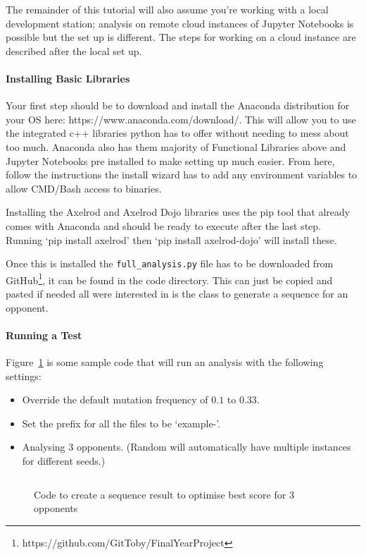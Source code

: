 The remainder of this tutorial will also assume you're working with a local development station;
analysis on remote cloud instances of Jupyter Notebooks is possible but the set up is different.
The steps for working on a cloud instance are described after the local set up.

\paragraph{Installing Basic Libraries}
Your first step should be to download and install the Anaconda distribution for your OS here: https://www.anaconda.com/download/.
This will allow you to use the integrated c++ libraries python has to offer without needing to mess about too much.
Anaconda also has them majority of Functional Libraries above and Jupyter Notebooks pre installed to make setting up much easier.
From here, follow the instructions the install wizard has to add any environment variables to allow CMD/Bash access to binaries.

Installing the Axelrod and Axelrod Dojo libraries uses the pip tool that already comes with Anaconda and should be ready to execute after the last step.
Running `pip install axelrod' then `pip install axelrod-dojo' will install these.

Once this is installed the \texttt{full\_analysis.py} file has to be downloaded from GitHub\footnote{https://github.com/GitToby/FinalYearProject}, it can be found in the code directory.
This can just be copied and pasted if needed all were interested in is the class to generate a sequence for an opponent.

\paragraph{Running a Test}
Figure~\ref{code:analysisExample} is some sample code that will run an analysis with the following settings:
\begin{itemize}
    \item Override the default mutation frequency of \(0.1\) to \(0.33\).
    \item Set the prefix for all the files to be `example-'.
    \item Analysing 3 opponents. (Random will automatically have multiple instances for different seeds.) 
\end{itemize}
\begin{figure}[ht]
    \centering
    \inputminted{python}{code_snippets/analysisExample.py}
    \caption{Code to create a sequence result to optimise best score for 3 opponents}\label{code:analysisExample}
\end{figure}

